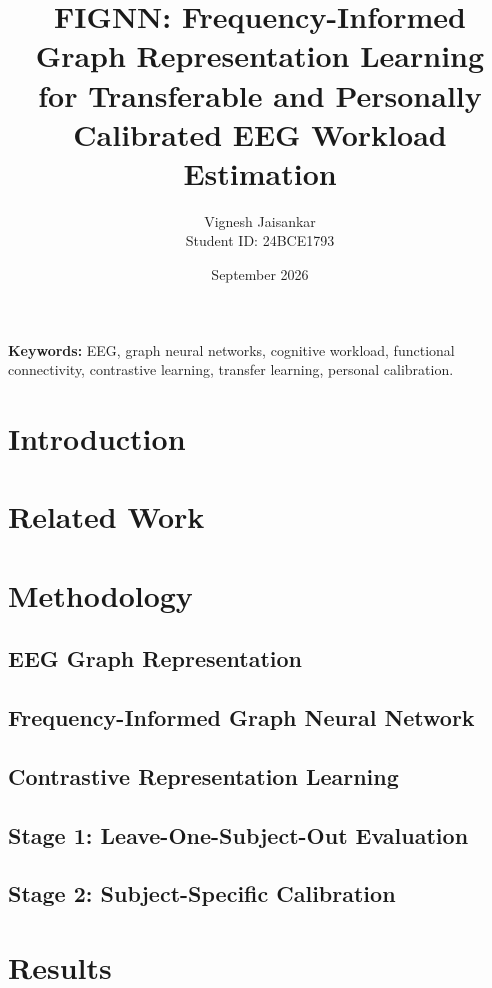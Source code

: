 \documentclass[11pt,a4paper]{article}
\title{
\textbf{FIGNN: Frequency-Informed Graph Representation Learning}\\
for Transferable and Personally Calibrated EEG Workload Estimation
}
\author{
Vignesh Jaisankar\\
Student ID: 24BCE1793
}
\date{September 2026}
\begin{document}
\maketitle

\begin{abstract}
\end{abstract}

\noindent\textbf{Keywords:}
EEG, graph neural networks, cognitive workload, functional connectivity,
contrastive learning, transfer learning, personal calibration.

\section{Introduction}

\section{Related Work}

\section{Methodology}

\subsection{EEG Graph Representation}

\subsection{Frequency-Informed Graph Neural Network}

\subsection{Contrastive Representation Learning}

\subsection{Stage 1: Leave-One-Subject-Out Evaluation}

\subsection{Stage 2: Subject-Specific Calibration}

\section{Results}
\end{document}
